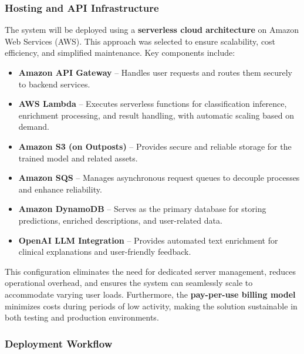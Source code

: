 \documentclass[
  12pt,
  oneside]{article}
\providecommand{\tightlist}{%
  \setlength{\itemsep}{0pt}\setlength{\parskip}{0pt}}
\begin{document}
\subsubsection{Hosting and API
Infrastructure}\label{hosting-and-api-infrastructure}

The system will be deployed using a \textbf{serverless cloud
architecture} on Amazon Web Services (AWS). This approach was selected
to ensure scalability, cost efficiency, and simplified maintenance. Key
components include:

\begin{itemize}
\tightlist
\item
  \textbf{Amazon API Gateway} -- Handles user requests and routes them
  securely to backend services.\\
\item
  \textbf{AWS Lambda} -- Executes serverless functions for
  classification inference, enrichment processing, and result handling,
  with automatic scaling based on demand.\\
\item
  \textbf{Amazon S3 (on Outposts)} -- Provides secure and reliable
  storage for the trained model and related assets.\\
\item
  \textbf{Amazon SQS} -- Manages asynchronous request queues to decouple
  processes and enhance reliability.\\
\item
  \textbf{Amazon DynamoDB} -- Serves as the primary database for storing
  predictions, enriched descriptions, and user-related data.\\
\item
  \textbf{OpenAI LLM Integration} -- Provides automated text enrichment
  for clinical explanations and user-friendly feedback.
\end{itemize}

This configuration eliminates the need for dedicated server management,
reduces operational overhead, and ensures the system can seamlessly
scale to accommodate varying user loads. Furthermore, the
\textbf{pay-per-use billing model} minimizes costs during periods of low
activity, making the solution sustainable in both testing and production
environments.

\subsubsection{Deployment Workflow}\label{deployment-workflow}
\end{document}
